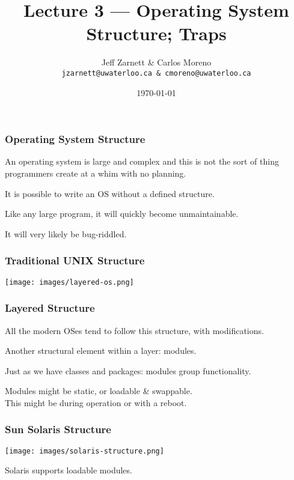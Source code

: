 

\title{Lecture 3 --- Operating System Structure; Traps }

\author{Jeff Zarnett \& Carlos Moreno \\ \small \texttt{jzarnett@uwaterloo.ca \& \texttt{cmoreno@uwaterloo.ca}}}
\date{\today}




\begin{frame}
  \titlepage

 \end{frame}

\begin{frame}
\frametitle{Operating System Structure}

An operating system is large and complex and this is not the sort of thing programmers create at a whim with no planning.

It is possible to write an OS without a defined structure. 

Like any large program, it will quickly become unmaintainable.

It will very likely be bug-riddled. 

\end{frame}

\begin{frame}
\frametitle{Traditional UNIX Structure}

\begin{center}
\texttt{[image: images/layered-os.png]}
\end{center}


\end{frame}

\begin{frame}
\frametitle{Layered Structure}

All the modern OSes tend to follow this structure, with modifications.

Another structural element within a layer: modules.

Just as we have classes and packages: modules group functionality.

Modules might be static, or loadable \& swappable.\\
\quad This might be during operation or with a reboot.

\end{frame}

\begin{frame}
\frametitle{Sun Solaris Structure}

\begin{center}
\texttt{[image: images/solaris-structure.png]}
\end{center}

Solaris supports loadable modules.

\end{frame}

